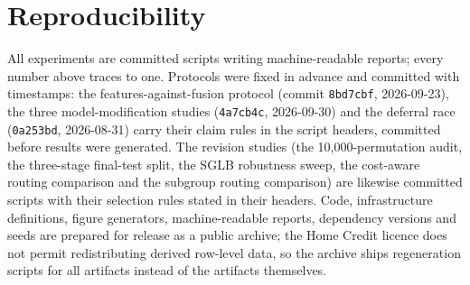 \documentclass[conference]{IEEEtran}
\begin{document}
\section*{Reproducibility}
All experiments are committed scripts writing machine-readable reports;
every number above traces to one. Protocols were fixed in advance and
committed with timestamps: the features-against-fusion protocol (commit
\texttt{8bd7cbf}, 2026-09-23), the three model-modification studies
(\texttt{4a7cb4c}, 2026-09-30) and the deferral race (\texttt{0a253bd},
2026-08-31) carry their claim rules in the script headers, committed before
results were generated. The revision studies (the 10{,}000-permutation
audit, the three-stage final-test split, the SGLB robustness sweep, the
cost-aware routing comparison and the subgroup routing comparison) are
likewise committed scripts with their selection rules stated in their
headers. Code, infrastructure definitions, figure generators,
machine-readable reports, dependency versions and seeds are prepared for
release as a public archive; the Home Credit licence does not permit
redistributing derived row-level data, so the archive ships regeneration
scripts for all artifacts instead of the artifacts themselves.
\end{document}

